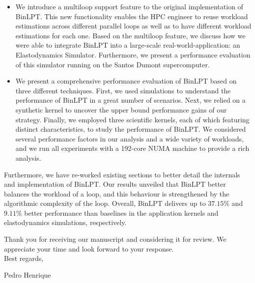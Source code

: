 \documentclass[a4paper,10pt,english]{article}
\def\firstname{Pedro Henrique\xspace}
\begin{document}
	\begin{itemize}
		\item We introduce a multiloop support feature to the original
			implementation of BinLPT. This new functionality enables the HPC
			engineer to reuse workload estimations across different parallel
			loops as well as to have different workload estimations for each
			one. Based on the multiloop feature, we discuss how we were able to
			integrate BinLPT into a large-scale real-world-application: an
			Elastodynamics Simulator. Furthermore, we present a performance
			evaluation of this simulator running on the Santos Dumont
			supercomputer.

		\item We present a comprehensive performance evaluation of BinLPT based
			on three different techniques.  First, we used simulations to
			understand the performance of BinLPT in a great number of
			scenarios.  Next, we relied on a synthetic kernel to uncover the
			upper bound performance gains of our strategy.  Finally, we
			employed three scientific kernels, each of which featuring distinct
			characteristics, to study the performance of BinLPT.  We considered
			several performance factors in our analysis and a wide variety of
			workloads, and we run all experiments with a 192-core NUMA machine
			to provide a rich analysis.
	\end{itemize}

Furthermore, we have re-worked existing sections to better detail the internals
and implementation of BinLPT. Our results unveiled that BinLPT better balances
the workload of a loop, and this behaviour is strengthened by the algorithmic
complexity of the loop.  Overall, BinLPT delivers up to $37.15\%$ and $9.11\%$
better performance than baselines in the application kernels and elastodynamics
simulations, respectively.

Thank you for receiving our manuscript and considering it for review. We
appreciate your time and look forward to your response.\\

Best regards,

\firstname
\end{document}
